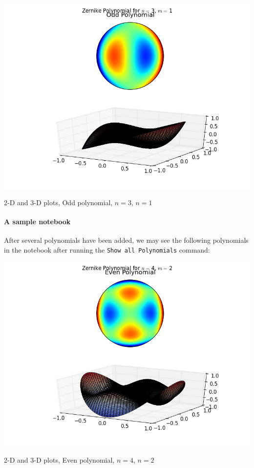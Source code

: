 \documentclass{tufte-handout}
\begin{document}
\begin{marginfigure}[-40mm]%
  \includegraphics[width=\linewidth]{img/3-1-compare-odd.png}
  \caption{2-D and 3-D plots, Odd polynomial, $n=3$, $n=1$}
\end{marginfigure}

\paragraph{A sample notebook}
After several polynomials have been added, we may see the following polynomials in the notebook after running the \Verb|Show all Polynomials| command:

\begin{marginfigure}[10mm]%
  \includegraphics[width=\linewidth]{img/4-2-compare-even.png}
  \caption{2-D and 3-D plots, Even polynomial, $n=4$, $n=2$}
\end{marginfigure}
\end{document}
